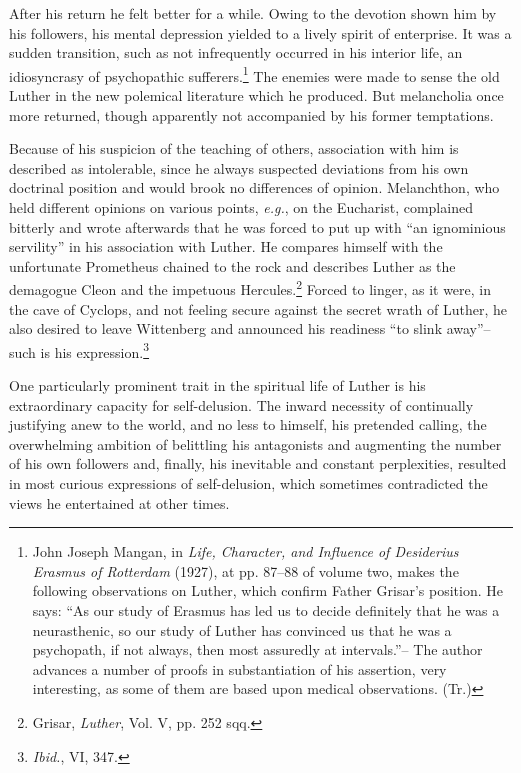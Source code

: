 After his return he felt better for a while. Owing to the devotion
shown him by his followers, his mental depression yielded to a lively
spirit of enterprise. It was a sudden transition, such as not infrequently
occurred in his interior life, an idiosyncrasy of psychopathic sufferers.\footnote
{John Joseph Mangan, in \textit{Life, Character, and Influence of Desiderius Erasmus of
Rotterdam} (1927), at pp. 87--88 of volume two, makes the following observations on
Luther, which confirm Father Grisar’s position. He says: “As our study of Erasmus has
led us to decide definitely that he was a neurasthenic, so our study of Luther has convinced
us that he was a psychopath, if not always, then most assuredly at intervals.”--
The author advances a number of proofs in substantiation of his assertion,
very interesting, as some of them are based upon medical observations. (Tr.)}
The enemies were made to sense the old Luther in the new
polemical literature which he produced. But melancholia once more
returned, though apparently not accompanied by his former temptations.

Because of his suspicion of the teaching of others, association with
him is described as intolerable, since he always suspected deviations
from his own doctrinal position and would brook no differences of
opinion. Melanchthon, who held different opinions on various points,
\textit{e.g.}, on the Eucharist, complained bitterly and wrote afterwards that
he was forced to put up with “an ignominious servility” in his association
with Luther. He compares himself with the unfortunate
Prometheus chained to the rock and describes Luther as the demagogue
Cleon and the impetuous Hercules.\footnote{Grisar, \textit{Luther}, Vol. V, pp. 252 sqq.}
 Forced to linger, as it were, in
the cave of Cyclops, and not feeling secure against the secret wrath
of Luther, he also desired to leave Wittenberg and announced his
readiness “to slink away”--such is his expression.\footnote{\textit{Ibid.}, VI, 347.}

One particularly prominent trait in the spiritual life of Luther is
his extraordinary capacity for self-delusion. The inward necessity of
continually justifying anew to the world, and no less to himself, his
pretended calling, the overwhelming ambition of belittling his
antagonists and augmenting the number of his own followers and,
finally, his inevitable and constant perplexities, resulted in most curious
expressions of self-delusion, which sometimes contradicted the
views he entertained at other times.

